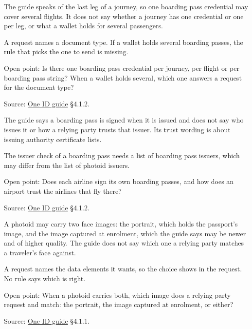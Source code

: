 \begin{definition}
  \label{def:c42}
  \notready
  The guide speaks of the last leg of a journey, so one boarding pass
  credential may cover several flights. It does not say whether a journey has
  one credential or one per leg, or what a wallet holds for several
  passengers.

  A request names a document type. If a wallet holds several boarding passes,
  the rule that picks the one to send is missing.

  Open point: Is there one boarding pass credential per journey, per flight
  or per boarding pass string? When a wallet holds several, which one answers
  a request for the document type?

  Source:
  \href{https://standards.atlassian.net/wiki/spaces/OneID/pages/2947416082/Technical+Implementation+Guide}{One
  ID guide} §4.1.2.
\end{definition}

\begin{definition}
  \label{def:c43}
  \notready
  The guide says a boarding pass is signed when it is issued and does not say
  who issues it or how a relying party trusts that issuer. Its trust wording
  is about issuing authority certificate lists.

  The issuer check of a boarding pass needs a list of boarding pass issuers,
  which may differ from the list of photoid issuers.

  Open point: Does each airline sign its own boarding passes, and how does an
  airport trust the airlines that fly there?

  Source:
  \href{https://standards.atlassian.net/wiki/spaces/OneID/pages/2947416082/Technical+Implementation+Guide}{One
  ID guide} §4.1.2.
\end{definition}

\begin{definition}
  \label{def:c97}
  \notready
  A photoid may carry two face images: the portrait, which holds the
  passport's image, and the image captured at enrolment, which the guide says
  may be newer and of higher quality. The guide does not say which one a
  relying party matches a traveler's face against.

  A request names the data elements it wants, so the choice shows in the
  request. No rule says which is right.

  Open point: When a photoid carries both, which image does a relying party
  request and match: the portrait, the image captured at enrolment, or
  either?

  Source:
  \href{https://standards.atlassian.net/wiki/spaces/OneID/pages/2947416082/Technical+Implementation+Guide}{One
  ID guide} §4.1.1.
\end{definition}

